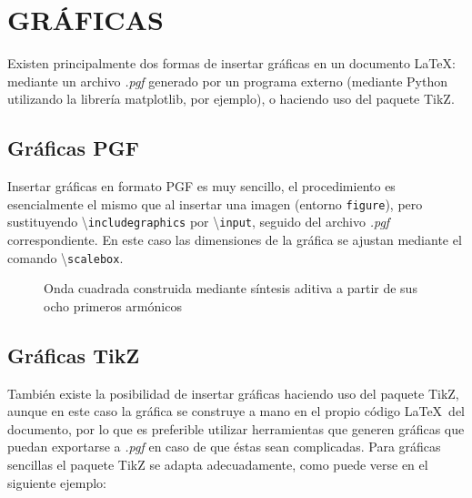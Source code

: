 \documentclass[a4paper, 11pt, spanish, twoside]{article}
\begin{document}



\newpage
\section{GRÁFICAS} \label{sec:graficas}

Existen principalmente dos formas de insertar gráficas en un documento \LaTeX: mediante un archivo \textit{.pgf} generado por un programa externo (mediante Python utilizando la librería matplotlib, por ejemplo), o haciendo uso del paquete TikZ.


\subsection{Gráficas PGF}

Insertar gráficas en formato PGF es muy sencillo, el procedimiento es esencialmente el mismo que al insertar una imagen (entorno \texttt{figure}), pero sustituyendo \textbackslash\texttt{includegraphics} por \textbackslash\texttt{input}, seguido del archivo \textit{.pgf} correspondiente. En este caso las dimensiones de la gráfica se ajustan mediante el comando \textbackslash\texttt{scalebox}. 

\begin{figure}[H]
    \centering
    \scalebox{1.1}{}
    \caption{Onda cuadrada construida mediante síntesis aditiva a partir de sus ocho primeros armónicos}
    \label{fig:ondacuadrada}
\end{figure}


\subsection{Gráficas TikZ} \label{sec:graficastikz}

También existe la posibilidad de insertar gráficas haciendo uso del paquete TikZ, aunque en este caso la gráfica se construye a mano en el propio código \LaTeX \ del documento, por lo que es preferible utilizar herramientas que generen gráficas que puedan exportarse a \textit{.pgf} en caso de que éstas sean complicadas. Para gráficas sencillas el paquete TikZ se adapta adecuadamente, como puede verse en el siguiente ejemplo:

\vspace{5pt}
\end{document}
